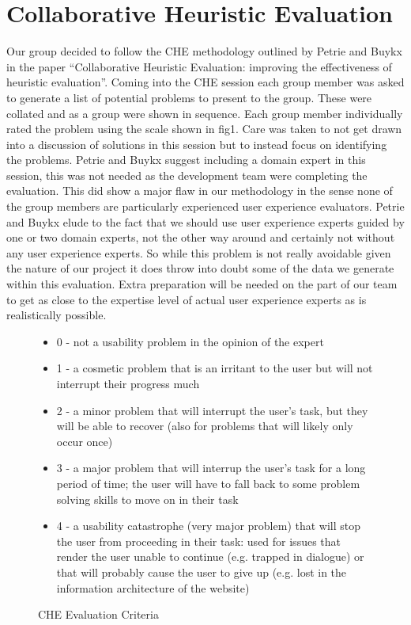 \section{Collaborative Heuristic Evaluation}


Our group decided to follow the CHE methodology outlined by Petrie and Buykx in the paper “Collaborative Heuristic Evaluation: improving the effectiveness of heuristic evaluation”. Coming into the CHE session each group member was asked to generate a list of potential problems to present to the group. These were collated and as a group were shown in sequence. Each group member individually rated the problem using the scale shown in fig1. Care was taken to not get drawn into a discussion of solutions in this session but to instead focus on identifying the problems. Petrie and Buykx suggest including a domain expert in this session, this was not needed as the development team were completing the evaluation. This did show a major flaw in our methodology in the sense none of the group members are particularly experienced user experience evaluators. Petrie and Buykx elude to the fact that we should use user experience experts guided by one or two domain experts, not the other way around and certainly not without any user experience experts. So while this problem is not really avoidable given the nature of our project it does throw into doubt some of the data we generate within this evaluation. Extra preparation will be needed on the part of our team to get as close to the expertise level of actual user experience experts as is realistically possible.

\begin{center}
\begin{figure}[h]
  \begin{itemize}
  \item 0 - not a usability problem in the opinion of the expert
  \item 1 - a cosmetic problem that is an irritant to the user but will not interrupt their progress much
  \item 2 - a minor problem that will interrupt the user's task, but they will be able to recover (also for problems that will likely only occur once)
  \item 3 - a major problem that will interrup the user's task for a long period of time; the user will have to fall back to some problem solving skills to move on in their task
  \item 4 - a usability catastrophe (very major problem) that will stop the user from proceeding in their task: used for issues that render the user unable to continue (e.g. trapped in dialogue) or that will probably cause the user to give up (e.g. lost in the information architecture of the website)
  \end{itemize}
  \caption{CHE Evaluation Criteria}
  \label{cheCriteria}
\end{figure}
\end{center}

